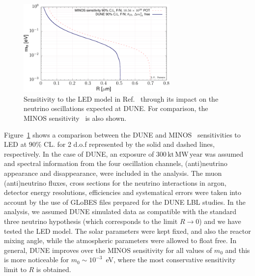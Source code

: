 \begin{figure}[ht]
\centerline{
\includegraphics[width=0.7\textwidth]{graphics/LED_sensitivity.pdf}
}
\caption{\label{fig:ledsensitivity} Sensitivity to the LED model in Ref.~\cite{Davoudiasl:2002fq} through its impact on the neutrino oscillations expected at 
DUNE. For comparison, the MINOS sensitivity~\cite{Adamson:2016yvy} is also shown.}
\end{figure}

Figure~\ref{fig:ledsensitivity} shows a comparison between the DUNE and MINOS~\cite{Adamson:2016yvy} 
sensitivities to LED at $90\%$ CL. for 2 d.o.f represented by the solid and dashed lines, respectively. 
In the case of DUNE, an exposure of $300\,\text{kt}\,\text{MW}\,\text{year}$ 
was assumed and spectral information from the four oscillation channels, (anti)neutrino 
appearance and disappearance, were included in the analysis. The muon (anti)neutrino 
fluxes, cross sections for the neutrino interactions in argon, detector energy 
resolutions, efficiencies and systematical errors were taken into account by the use of 
GLoBES files prepared for the DUNE LBL studies. In the analysis, we assumed DUNE 
simulated data as compatible with the standard three neutrino hypothesis (which corresponds to the limit $R\to 0$) and we have 
tested the LED model. The solar parameters were kept fixed, and also the reactor mixing 
angle, while the atmospheric parameters were allowed to float free. In general, DUNE 
improves over the MINOS sensitivity for all values of $m_0$ and this is more noticeable 
for $m_0\sim 10^{-3}$~eV, where the most conservative sensitivity limit to $R$ is 
obtained. 

